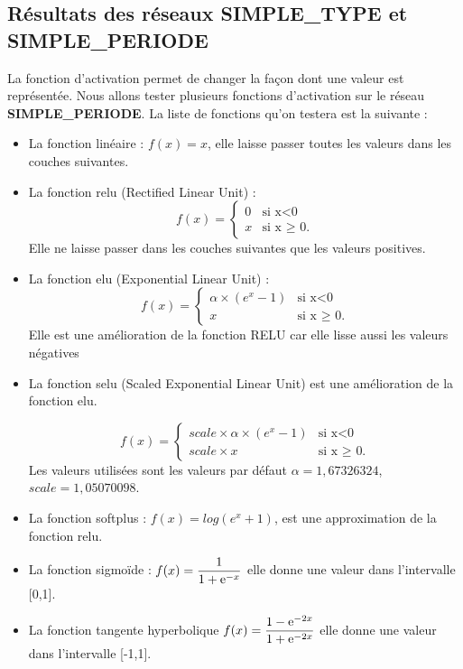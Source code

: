 \subsection{Résultats des réseaux \textbf{SIMPLE\_TYPE} et  \textbf{SIMPLE\_PERIODE}}
La fonction d'activation permet de changer la façon dont une valeur est représentée. Nous allons tester plusieurs fonctions d'activation sur le réseau \textbf{SIMPLE\_PERIODE}.
La liste de fonctions qu'on testera est la suivante :
\begin{itemize}[label=$\square$]
	\item La fonction linéaire :
	$f(x)=x$, elle laisse passer toutes les valeurs dans les couches suivantes. 
	\item La fonction relu (Rectified Linear Unit) :
	$$
	f(x)= \left\{
	\begin{array}{ll}
	0 & \mbox{si x<0} \\
	x & \mbox{si x $\geq$ 0.}
	\end{array}
	\right.
	$$
Elle ne laisse passer dans les couches suivantes que les valeurs positives. 
\item La fonction elu (Exponential Linear Unit) : 
$$
f(x)= \left\{
\begin{array}{ll}
\alpha \times (e^x - 1) & \mbox{si x<0} \\
x & \mbox{si x $\geq$ 0.}
\end{array}
\right.
$$
Elle est une amélioration de la fonction RELU car elle lisse aussi les valeurs négatives
\item La fonction  selu (Scaled Exponential Linear Unit) est une amélioration de la fonction elu.

$$
f(x)= \left\{
\begin{array}{ll}
scale \times \alpha \times (e^x - 1) & \mbox{si x<0} \\
scale \times x & \mbox{si x $\geq$ 0.}
\end{array}
\right.
$$
Les valeurs utilisées sont les valeurs par défaut $\alpha = 1,67326324$, $scale = 1,05070098$.
\item La fonction softplus : $f(x)=log(e^x + 1)$, est une approximation de la fonction relu.
	\item La fonction sigmoïde : 
${\displaystyle f(x)={\frac {1}{1+{\rm {e}}^{-x}}}}$ elle donne une valeur dans l'intervalle [0,1].
	
\item La fonction tangente hyperbolique ${\displaystyle f(x)={\frac {1-{\rm {e}}^{-2x}}{1+{\rm {e}}^{-2x}}}}$  elle donne une valeur dans l'intervalle [-1,1].
		
	\end{itemize}

